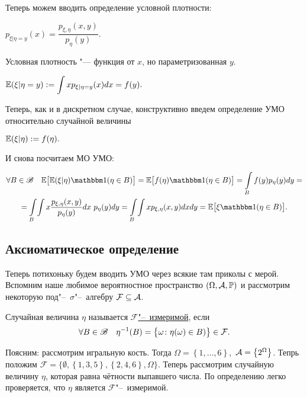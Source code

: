 \documentclass[../TV&MS.tex]{subfiles}
\begin{document}
Теперь можем вводить определение условной плотности:

\begin{Def}
    $p_{\xi | \eta = y}(x) = \dfrac{p_{\xi, \eta}(x,y)}{p_\eta(y)}$.
\end{Def} 

\begin{Wtf}
    Условная плотность "--- функция от $x$, но параметризованная $y$.
\end{Wtf}

\begin{Def}
    $\displaystyle \mathbb{E}(\xi | \eta = y) := \int xp_{\xi | \eta = y}(x)dx =
    f(y).$
\end{Def}

Теперь, как и в дискретном случае, конструктивно введем определение
УМО относительно случайной величины

\begin{Def}
    $\mathbb{E}(\xi | \eta) := f(\eta).$
\end{Def}
И снова посчитаем МО УМО:

\begin{multline}
    \forall B \in \Bor \quad
    \Expec\bigl[ \Expec(\xi | \eta) \Ind(\eta \in B) \bigr] =
    \Expec\bigl[ f(\eta)\Ind(\eta \in B) \bigr] =
    \int\limits_{B} f(y)p_\eta(y)dy = \\
    = \int\limits_{B}\!\int x \frac{p_{\xi, \eta}(x, y)}{p_\eta(y)}dx\ p_\eta(y)dy=
    \int\limits_{B}\!\int xp_{\xi, \eta}(x, y)dxdy = 
    \Expec\bigl[\xi \Ind(\eta \in B) \bigr]
.\end{multline} 

\subsection{Аксиоматическое определение}

Теперь потихоньку будем вводить УМО через всякие там приколы с мерой.
Вспомним наше любимое вероятностное пространство $(\Omega, \mathcal{A}, \mathbb{P})$
и рассмотрим некоторую под"--~$\sigma$"--~алгебру $\mathcal{F} \subseteq \mathcal{A}$.

\begin{Def}
    Случайная величина $\eta$ называется \uline{$\mathcal{F}$"--~измеримой},
    если 
    $$\forall B \in \mathscr{B} \quad \eta^{-1}(B) = \bigl\{\omega\colon\eta(\omega) \in B)\bigr\} \in 
    \mathcal{F}.$$
\end{Def} 

\begin{Wtf}
    Поясним: рассмотрим игральную кость.
    Тогда $\Omega = \left\{ 1, \ldots, 6 \right\}$,\ $\mathcal{A} = \left\{ 2^{\Omega} \right\}$.
    Тепрь положим $\mathcal{F} = \bigl\{ \emptyset, 
        \left\{ 1, 3, 5 \right\},
        \left\{ 2, 4, 6 \right\},
        \Omega \bigr\}$.
    Теперь рассмотрим случайную величину $\eta$, которая равна чётности выпавшего числа.
    По определению легко проверяется, что $\eta$ является $\mathcal{F}$"--~измеримой.
\end{Wtf} 
\end{document}
